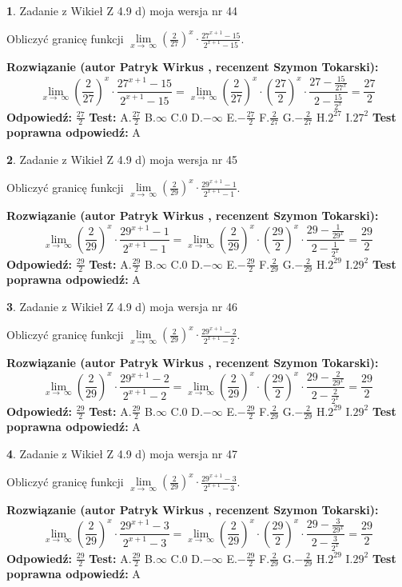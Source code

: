 \documentclass[12pt, a4paper]{article}
\theoremstyle{definition} %
\newtheorem{zad}{}
\newcommand{\zadStart}[1]{\begin{zad}#1\newline}
\newcommand{\zadStop}{\end{zad}}
\newcommand{\rozwStart}[2]{\noindent \textbf{Rozwiązanie (autor #1 , recenzent #2): }\newline}
\newcommand{\rozwStop}{\newline}
\newcommand{\odpStart}{\noindent \textbf{Odpowiedź:}\newline}
\newcommand{\odpStop}{\newline}
\newcommand{\testStart}{\noindent \textbf{Test:}\newline}
\newcommand{\testStop}{\newline}
\newcommand{\kluczStart}{\noindent \textbf{Test poprawna odpowiedź:}\newline}
\newcommand{\kluczStop}{\newline}
\begin{document}
\zadStart{Zadanie z Wikieł Z 4.9 d) moja wersja nr 44}


Obliczyć granicę funkcji  $\lim\limits_{x\to\ \infty}(\frac{2}{27})^{x}\cdot\frac{27^{x+1}-15}{2^{x+1}-15}$.
\zadStop
\rozwStart{Patryk Wirkus}{Szymon Tokarski}
$$\lim\limits_{x\to\ \infty}(\frac{2}{27})^{x}\cdot\frac{27^{x+1}-15}{2^{x+1}-15}=\lim\limits_{x\to\ \infty}(\frac{2}{27})^{x}\cdot(\frac{27}{2})^{x} \cdot \frac{27-\frac{15}{27^{x}}}{2-\frac{15}{2^{x}}} = \frac{27}{2}$$
\rozwStop
\odpStart
$\frac{27}{2}$
\odpStop
\testStart
A.$\frac{27}{2}$ B.$\infty$ C.$0$ D.$-\infty$ E.$-\frac{27}{2}$
F.$\frac{2}{27}$ G.$-\frac{2}{27}$
H.$2^{27}$
I.$27^{2}$
\testStop
\kluczStart
A
\kluczStop



\zadStart{Zadanie z Wikieł Z 4.9 d) moja wersja nr 45}


Obliczyć granicę funkcji  $\lim\limits_{x\to\ \infty}(\frac{2}{29})^{x}\cdot\frac{29^{x+1}-1}{2^{x+1}-1}$.
\zadStop
\rozwStart{Patryk Wirkus}{Szymon Tokarski}
$$\lim\limits_{x\to\ \infty}(\frac{2}{29})^{x}\cdot\frac{29^{x+1}-1}{2^{x+1}-1}=\lim\limits_{x\to\ \infty}(\frac{2}{29})^{x}\cdot(\frac{29}{2})^{x} \cdot \frac{29-\frac{1}{29^{x}}}{2-\frac{1}{2^{x}}} = \frac{29}{2}$$
\rozwStop
\odpStart
$\frac{29}{2}$
\odpStop
\testStart
A.$\frac{29}{2}$ B.$\infty$ C.$0$ D.$-\infty$ E.$-\frac{29}{2}$
F.$\frac{2}{29}$ G.$-\frac{2}{29}$
H.$2^{29}$
I.$29^{2}$
\testStop
\kluczStart
A
\kluczStop



\zadStart{Zadanie z Wikieł Z 4.9 d) moja wersja nr 46}


Obliczyć granicę funkcji  $\lim\limits_{x\to\ \infty}(\frac{2}{29})^{x}\cdot\frac{29^{x+1}-2}{2^{x+1}-2}$.
\zadStop
\rozwStart{Patryk Wirkus}{Szymon Tokarski}
$$\lim\limits_{x\to\ \infty}(\frac{2}{29})^{x}\cdot\frac{29^{x+1}-2}{2^{x+1}-2}=\lim\limits_{x\to\ \infty}(\frac{2}{29})^{x}\cdot(\frac{29}{2})^{x} \cdot \frac{29-\frac{2}{29^{x}}}{2-\frac{2}{2^{x}}} = \frac{29}{2}$$
\rozwStop
\odpStart
$\frac{29}{2}$
\odpStop
\testStart
A.$\frac{29}{2}$ B.$\infty$ C.$0$ D.$-\infty$ E.$-\frac{29}{2}$
F.$\frac{2}{29}$ G.$-\frac{2}{29}$
H.$2^{29}$
I.$29^{2}$
\testStop
\kluczStart
A
\kluczStop



\zadStart{Zadanie z Wikieł Z 4.9 d) moja wersja nr 47}


Obliczyć granicę funkcji  $\lim\limits_{x\to\ \infty}(\frac{2}{29})^{x}\cdot\frac{29^{x+1}-3}{2^{x+1}-3}$.
\zadStop
\rozwStart{Patryk Wirkus}{Szymon Tokarski}
$$\lim\limits_{x\to\ \infty}(\frac{2}{29})^{x}\cdot\frac{29^{x+1}-3}{2^{x+1}-3}=\lim\limits_{x\to\ \infty}(\frac{2}{29})^{x}\cdot(\frac{29}{2})^{x} \cdot \frac{29-\frac{3}{29^{x}}}{2-\frac{3}{2^{x}}} = \frac{29}{2}$$
\rozwStop
\odpStart
$\frac{29}{2}$
\odpStop
\testStart
A.$\frac{29}{2}$ B.$\infty$ C.$0$ D.$-\infty$ E.$-\frac{29}{2}$
F.$\frac{2}{29}$ G.$-\frac{2}{29}$
H.$2^{29}$
I.$29^{2}$
\testStop
\kluczStart
A
\kluczStop
\end{document}
